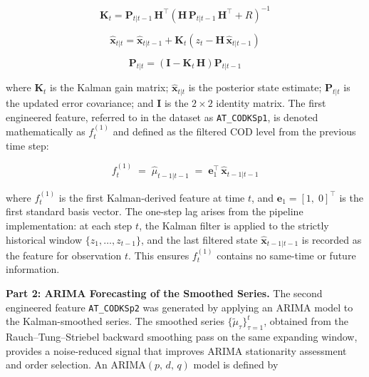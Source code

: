 \documentclass[conference]{IEEEtran}
\begin{document}
\begin{equation}
    \mathbf{K}_t = \mathbf{P}_{t|t-1}\,\mathbf{H}^\top \!\left(\mathbf{H}\,\mathbf{P}_{t|t-1}\,\mathbf{H}^\top + R\right)^{-1}
    \label{eq:kf_gain}
\end{equation}

\begin{equation}
    \hat{\mathbf{x}}_{t|t} = \hat{\mathbf{x}}_{t|t-1} + \mathbf{K}_t\!\left(z_t - \mathbf{H}\,\hat{\mathbf{x}}_{t|t-1}\right)
    \label{eq:kf_update_state}
\end{equation}

\begin{equation}
    \mathbf{P}_{t|t} = \left(\mathbf{I} - \mathbf{K}_t\,\mathbf{H}\right)\mathbf{P}_{t|t-1}
    \label{eq:kf_update_cov}
\end{equation}

where $\mathbf{K}_t$ is the Kalman gain matrix; $\hat{\mathbf{x}}_{t|t}$ is the posterior state estimate; $\mathbf{P}_{t|t}$ is the updated error covariance; and $\mathbf{I}$ is the $2\!\times\!2$ identity matrix. The first engineered feature, referred to in the dataset as \texttt{AT\_CODKSp1}, is denoted mathematically as $f^{(1)}_t$ and defined as the filtered COD level from the previous time step:

\begin{equation}
    f^{(1)}_t \;=\; \hat{\mu}_{t-1|t-1} \;=\; \mathbf{e}_1^\top\,\hat{\mathbf{x}}_{t-1|t-1}
    \label{eq:ksp1}
\end{equation}

where $f^{(1)}_t$ is the first Kalman-derived feature at time $t$, and $\mathbf{e}_1 = [1,\;0]^\top$ is the first standard basis vector. The one-step lag arises from the pipeline implementation: at each step $t$, the Kalman filter is applied to the strictly historical window $\{z_1,\ldots,z_{t-1}\}$, and the last filtered state $\hat{\mathbf{x}}_{t-1|t-1}$ is recorded as the feature for observation $t$. This ensures $f^{(1)}_t$ contains no same-time or future information.

\textbf{Part 2: ARIMA Forecasting of the Smoothed Series.}
The second engineered feature \texttt{AT\_CODKSp2} was generated by applying an ARIMA model to the Kalman-smoothed series. The smoothed series $\{\tilde{\mu}_\tau\}_{\tau=1}^{t}$, obtained from the Rauch--Tung--Striebel backward smoothing pass on the same expanding window, provides a noise-reduced signal that improves ARIMA stationarity assessment and order selection. An ARIMA$(p,\,d,\,q)$ model is defined by
\end{document}
